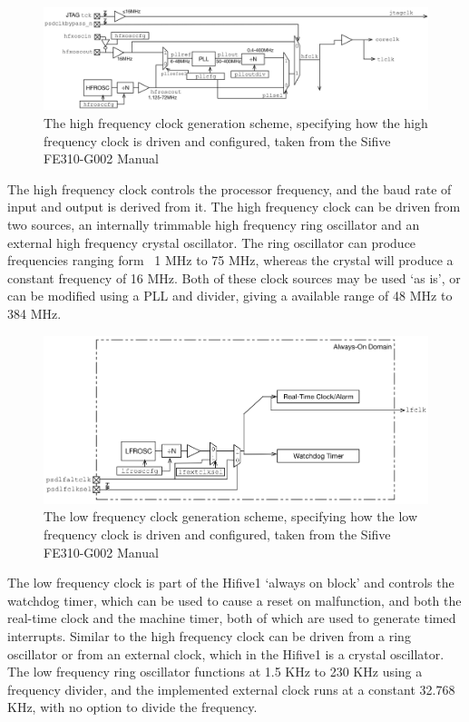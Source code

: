 \begin{figure}[H]
    \includegraphics[width=0.9\columnwidth]{figures/hfclock.png}
    \centering
    \caption[High Frequency Clock Diagram]{The high frequency clock generation scheme, specifying how the high frequency clock is driven and configured, taken from the Sifive FE310-G002 Manual\cite{sifive_manual}}
\end{figure}
The high frequency clock controls the processor frequency, and the baud rate of input and output is derived from it. The high frequency clock can be driven from two sources, an internally trimmable high frequency ring oscillator and an external high frequency crystal oscillator. The ring oscillator can produce frequencies ranging form ~1 MHz to 75 MHz, whereas the crystal will produce a constant frequency of 16 MHz. Both of these clock sources may be used `as is', or can be modified using a PLL and divider, giving a available range of 48 MHz to 384 MHz. 
\\
\begin{figure}[H]
    \includegraphics[width=0.9\columnwidth]{figures/lfclock.png}
    \centering
    \caption[Low Frequency Clock Diagram]{The low frequency clock generation scheme, specifying how the low frequency clock is driven and configured, taken from the Sifive FE310-G002 Manual\cite{sifive_manual}}
\end{figure}
The low frequency clock is part of the Hifive1 `always on block' and controls the watchdog timer, which can be used to cause a reset on malfunction, and both the real-time clock and the machine timer, both of which are used to generate timed interrupts. Similar to the high frequency clock can be driven from a ring oscillator or from an external clock, which in the Hifive1 is a crystal oscillator. The low frequency ring oscillator functions at 1.5 KHz to 230 KHz using a frequency divider, and the implemented external clock runs at a constant 32.768 KHz, with no option to divide the frequency.

